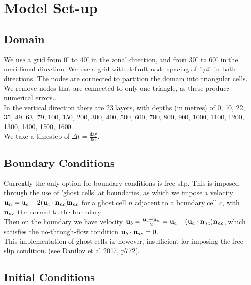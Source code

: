 \documentclass[10pt]{article}
\begin{document}
\section{Model Set-up}

\subsection{Domain}

We use a grid from $0^\circ$ to $40^\circ$ in the zonal direction, and from $30^\circ$ to $60^\circ$ in the meridional direction. We use a grid with default node spacing of $1/4^{\circ}$ in both directions. The nodes are  connected to partition the domain into triangular cells. We remove nodes that are connected to only one triangle, as these produce numerical errors..\\
\linebreak
In the vertical direction there are 23 layers, with depths (in metres) of 0, 10, 22, 35, 49, 63, 79, 100, 150, 200, 300, 400, 500, 600, 700, 800, 900, 1000, 1100, 1200, 1300, 1400, 1500, 1600.\\
\linebreak
We take a timestep of $\Delta t = \frac{\text{day}}{96}$. 

\subsection{Boundary Conditions}

Currently the only option for boundary conditions is free-slip. This is imposed through the use of 'ghost cells' at boundaries, as which we impose a velocity $\mathbf{u}_{n} = \mathbf{u}_{c} - 2(\mathbf{u}_{c}\cdot\mathbf{n}_{nc})\mathbf{n}_{nc}$ for a ghost cell $n$ adjacent to a boundary cell $c$, with $\mathbf{n}_{nc}$ the normal to the boundary. \\
\linebreak
Then on the boundary we have velocity $\mathbf{u}_{b} = \frac{\mathbf{u}_{c} + \mathbf{u}_{n}}{2} = \mathbf{u}_{c} - (\mathbf{u}_{c}\cdot \mathbf{n}_{nc})\mathbf{n}_{nc}$, which satisfies the no-through-flow condition $\mathbf{u}_{b}\cdot \mathbf{n}_{nc} = 0$.\\
\linebreak
This implementation of ghost cells is, however, insufficient for imposing the free-slip condition. (see Danilov et al 2017, p772).

\subsection{Initial Conditions}
\end{document}
